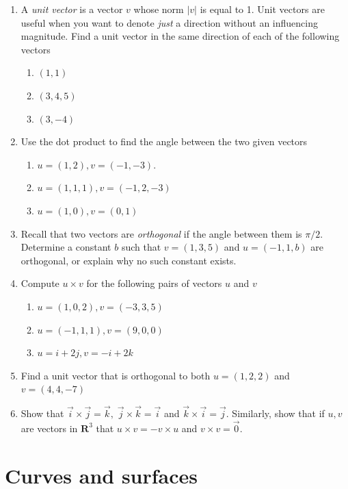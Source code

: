 \documentclass[12pt]{article}
\numberwithin{equation}{subsection}
\numberwithin{figure}{subsection}
\theoremstyle{note}
\begin{document}
{\begin{enumerate}[label=\arabic*.]
\item A \textit{unit vector} is a vector $v$ whose norm $|v|$ is equal to 1. Unit vectors are useful when you want to denote \textit{just} a direction without an influencing magnitude. Find a unit vector in the same direction of each of the following vectors

\begin{enumerate}
	\item $(1,1)$
	\item $(3,4,5)$
	\item $(3,-4)$
\end{enumerate}

\item Use the dot product to find the angle between the two given vectors

\begin{enumerate}
	\item $u=(1,2), v=(-1,-3)$.
	\item $u=(1,1,1), v=(-1,2,-3)$
	\item $u=(1,0), v=(0,1)$
\end{enumerate}

\item Recall that two vectors are \textit{orthogonal} if the angle between them is $\pi/2$. Determine a constant $b$ such that $v=(1,3,5)$ and $u=(-1,1,b)$ are orthogonal, or explain why no such constant exists. 

\item Compute $u\times v$ for the following pairs of vectors $u$ and $v$
\begin{enumerate}
	\item $u=(1,0,2), v=(-3,3,5)$
	\item $u=(-1,1,1), v=(9,0,0)$
	\item $u=i+2j, v=-i+2k$
\end{enumerate}

\item Find a unit vector that is orthogonal to both $u=(1,2,2)$ and $v=(4,4,-7)$

\item Show that $\vec{i}\times \vec{j}=\vec{k}, \; \vec{j}\times \vec{k}=\vec{i}$ and $\vec{k}\times \vec{i}=\vec{j}$. Similarly, show that if $u,v$ are vectors in $\mathbf{R}^3$ that $u\times v=-v\times u$ and $v\times v=\vec{0}$.
\end{enumerate}

\section{Curves and surfaces} \label{sec-curves-surf}

}
\end{document}

